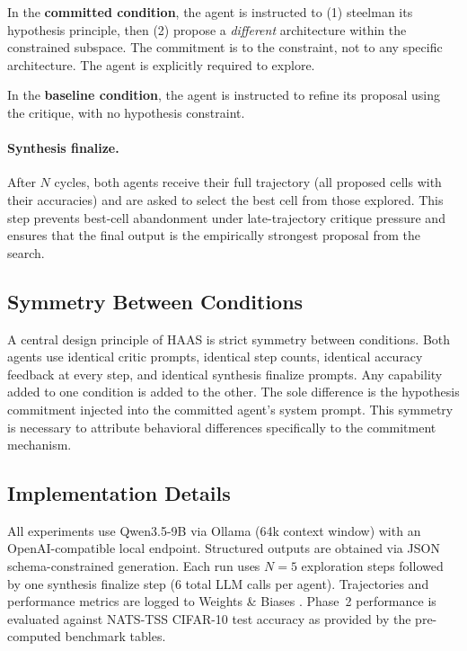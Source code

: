 \documentclass[10pt]{article}
\newcommand{\haas}{\textsc{HAAS}}
\begin{document}
In the \textbf{committed condition}, the agent is instructed to (1) steelman its
hypothesis principle, then (2) propose a \emph{different} architecture within the
constrained subspace. The commitment is to the constraint, not to any specific
architecture. The agent is explicitly required to explore.

In the \textbf{baseline condition}, the agent is instructed to refine its
proposal using the critique, with no hypothesis constraint.

\paragraph{Synthesis finalize.} After $N$ cycles, both agents receive their full
trajectory (all proposed cells with their accuracies) and are asked to select the
best cell from those explored. This step prevents best-cell abandonment under
late-trajectory critique pressure and ensures that the final output is the
empirically strongest proposal from the search.

\subsection{Symmetry Between Conditions}
\label{sec:symmetry}

A central design principle of \haas{} is strict symmetry between conditions.
Both agents use identical critic prompts, identical step counts, identical
accuracy feedback at every step, and identical synthesis finalize prompts. Any
capability added to one condition is added to the other. The sole difference is
the hypothesis commitment injected into the committed agent's system prompt. This
symmetry is necessary to attribute behavioral differences specifically to the
commitment mechanism.

\subsection{Implementation Details}
\label{sec:implementation}

All experiments use Qwen3.5-9B \citep{qwen2025qwen35} via Ollama (64k context window)
with an OpenAI-compatible local endpoint. Structured outputs are obtained via JSON
schema-constrained generation. Each run uses $N=5$ exploration steps followed by
one synthesis finalize step (6 total LLM calls per agent). Trajectories and
performance metrics are logged to Weights \& Biases \citep{wandb}. Phase~2
performance is evaluated against NATS-TSS CIFAR-10 test accuracy as provided
by the pre-computed benchmark tables.
\end{document}
